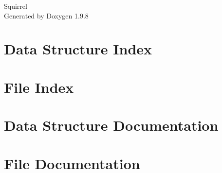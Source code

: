 \documentclass[twoside]{book}
\newcommand{\+}{\discretionary{\mbox{\scriptsize$\hookleftarrow$}}{}{}}
\newcommand{\clearemptydoublepage}{%
    \newpage{\pagestyle{empty}\cleardoublepage}%
  }
\begin{document}
  \raggedbottom
    \hypersetup{pageanchor=false,
                bookmarksnumbered=true,
                pdfencoding=unicode
               }
  \begin{titlepage}
  \vspace*{7cm}
  \begin{center}%
  {\Large Squirrel}\\
  \vspace*{1cm}
  {\large Generated by Doxygen 1.9.8}\\
  \end{center}
  \end{titlepage}
  \clearemptydoublepage
  \tableofcontents
  \clearemptydoublepage
  \hypersetup{pageanchor=true}
\chapter{Data Structure Index}

\chapter{File Index}

\chapter{Data Structure Documentation}



\chapter{File Documentation}


  \backmatter
  \newpage
  \clearemptydoublepage
  \printindex
\end{document}
